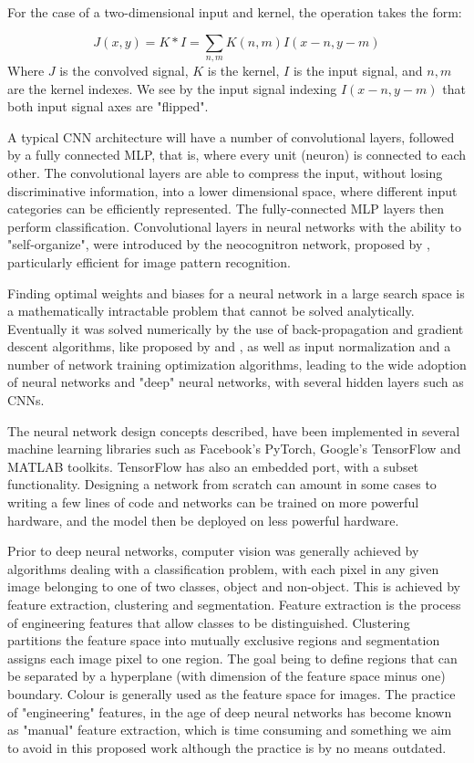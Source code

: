 For the case of a two-dimensional input and kernel, the operation takes the form:

\begin{equation}
J(x,y) = K * I = \sum_{n,m}K(n,m)I(x-n,y-m) 
\end{equation}
Where $J$ is the convolved signal, $K$ is the kernel, $I$ is the input signal, and $n,m$ are the kernel indexes. We see by the input signal indexing $I(x-n,y-m)$ that both input signal axes are "flipped".

A typical CNN architecture will have a number of convolutional layers, followed by a fully connected MLP, that is, where every unit (neuron) is connected to each other. The convolutional layers are able to compress the input, without losing discriminative information, into a lower dimensional space, where different input categories can be efficiently represented.
The fully-connected MLP layers then perform classification. Convolutional layers in neural networks with the ability to "self-organize", were introduced by the neocognitron network, proposed by \cite{fukushima:neocognitronbc}, particularly efficient for image pattern recognition.

Finding optimal weights and biases for a neural network in a large search space is a mathematically intractable problem that cannot be solved analytically. Eventually it was solved numerically by the use of back-propagation and gradient descent algorithms, like proposed by \cite{Rumelhart:1986we} and \cite{Lecun98gradient-basedlearning}, as well as input normalization and a number of network training optimization algorithms, leading to the wide adoption of neural networks and  "deep" neural networks, with several hidden layers such as CNNs.

The neural network design concepts described, have been implemented in several machine learning libraries such as Facebook's PyTorch, Google's TensorFlow and MATLAB toolkits. TensorFlow has also an embedded port, with a subset functionality. Designing a network from scratch can amount in some cases to writing a few lines of code and networks can be trained on more powerful hardware, and the model then be deployed on less powerful hardware. 

Prior to deep neural networks, computer vision was generally achieved by algorithms dealing with a classification problem, with each pixel in any given image belonging to one of two classes, object and non-object. This is achieved by feature extraction, clustering and segmentation. Feature extraction is the process of engineering features that allow classes to be distinguished. Clustering partitions the feature space into mutually exclusive regions and segmentation assigns each image pixel to one region. The goal being to define regions that can be separated by a hyperplane (with dimension of the feature space minus one) boundary. Colour is generally used as the feature space for images. The practice of "engineering" features, in the age of deep neural networks has become known as "manual" feature extraction, which is time consuming and something we aim to avoid in this proposed work although the practice is by no means outdated.   

